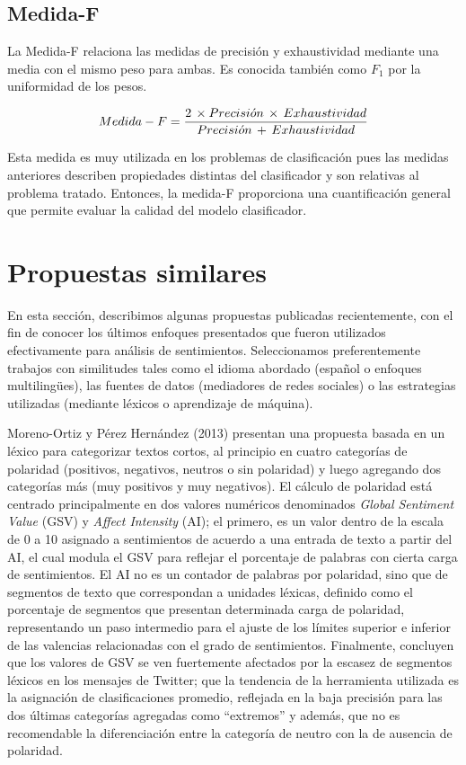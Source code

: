 {\subsection{Medida-F}
La Medida-F relaciona las medidas de precisi\'on y exhaustividad mediante una media con el mismo peso para ambas. Es conocida tambi\'en como $F_1$ por la uniformidad de los pesos.
\newline

$$ Medida-F = {2 \, \times Precisi\acute{o}n \, \times \, Exhaustividad \over Precisi\acute{o}n \, + \, Exhaustividad}$$
\newline

Esta medida es muy utilizada en los problemas de clasificaci\'on pues las medidas anteriores describen propiedades distintas del clasificador y son relativas al problema tratado. Entonces, la medida-F proporciona una cuantificaci\'on general que permite evaluar la calidad del modelo clasificador.

\section{Propuestas similares}

En esta secci\'on, describimos algunas propuestas publicadas recientemente, con el fin de conocer los \'ultimos enfoques presentados que fueron utilizados efectivamente para an\'alisis de sentimientos. Seleccionamos preferentemente trabajos con similitudes tales como el idioma abordado (espa\~nol o enfoques multiling\"ues), las fuentes de datos (mediadores de redes sociales) o las estrategias utilizadas (mediante l\'exicos o aprendizaje de m\'aquina).
\newline

Moreno-Ortiz y P\'erez Hern\'andez (2013) presentan una propuesta basada en un l\'exico para categorizar textos cortos, al principio en cuatro categor\'ias de polaridad (positivos, negativos, neutros o sin polaridad) y luego agregando dos categor\'ias m\'as (muy positivos y muy negativos). El c\'alculo de polaridad est\'a centrado principalmente en dos valores num\'ericos denominados \textit{Global Sentiment Value} (GSV) y \textit{Affect Intensity} (AI); el primero, es un valor dentro de la escala de 0 a 10 asignado a sentimientos de acuerdo a una entrada de texto a partir del AI, el cual modula el GSV para reflejar el porcentaje de palabras con cierta carga de sentimientos. El AI no es un contador de palabras por polaridad, sino que de segmentos de texto que correspondan a unidades l\'exicas, definido como el porcentaje de segmentos que presentan determinada carga de polaridad, representando un paso intermedio para el ajuste de los l\'imites superior e inferior de las valencias relacionadas con el grado de sentimientos. Finalmente, concluyen que los valores de GSV se ven fuertemente afectados por la escasez de segmentos l\'exicos en los mensajes de Twitter; que la tendencia de la herramienta utilizada es la asignaci\'on de clasificaciones promedio, reflejada en la baja precisi\'on para las dos \'ultimas categor\'ias agregadas como ``extremos'' y adem\'as, que no es recomendable la diferenciaci\'on entre la categor\'ia de neutro con la de ausencia de polaridad.
\newline

}
